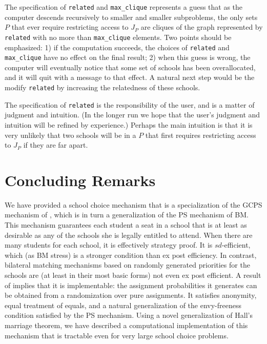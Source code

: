 \documentclass[12pt]{article}
\theoremstyle{definition}
\begin{document}
The specification of \texttt{related} and \texttt{max\_clique}
represents a guess that as the computer descends recursively to
smaller and smaller subproblems, the only sets $P$ that ever require
restricting access to $J_P$ are cliques of the graph represented by
\texttt{related} with no more than \texttt{max\_clique} elements.  Two
points should be emphasized: 1) if the computation succeeds, the
choices of \texttt{related} and \texttt{max\_clique} have no effect on
the final result; 2) when this guess is wrong, the computer will
eventually notice that some set of schools has been overallocated, and
it will quit with a message to that effect.  A natural next step would
be the modify \texttt{related} by increasing the relatedness of these
schools.

The specification of \texttt{related} is the responsibility of the
user, and is a matter of judgment and intuition.  (In the longer run
we hope that the user's judgment and intuition will be refined by
experience.)  Perhaps the main intuition is that it is very unlikely
that two schools will be in a $P$ that first requires restricting
access to $J_P$ if they are far apart.  


\section{Concluding Remarks} \label{sec:Conclusion}

We have provided a school choice mechanism that is a specialization of
the GCPS mechanism of \cite{balbuzanov22jet}, which is in turn a
generalization of the PS mechanism of BM.  This mechanism guarantees
each student a seat in a school that is at least as desirable as any
of the schools she is legally entitled to attend.  When there are many
students for each school, it is effectively strategy proof.  It is
$sd$-efficient, which (as BM stress) is a stronger condition than ex
post efficiency.  In contrast, bilateral matching mechanisms based on
randomly generated priorities for the schools are (at least in their
most basic forms) not even ex post efficient.  A result of
\cite{bckm13aer} implies that it is implementable: the assignment
probabilities it generates can be obtained from a randomization over
pure assignments.  It satisfies anonymity, equal treatment of equals,
and a natural generalization of the envy-freeness condition satisfied
by the PS mechanism.  Using a novel generalization of Hall's marriage
theorem, we have described a computational implementation of this
mechanism that is tractable even for very large school choice
problems.
\end{document}

